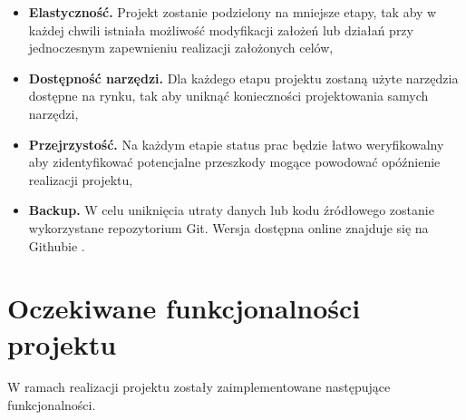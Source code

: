 \documentclass[a4paper,12pt,reqno]{article}
\begin{document}
\begin{itemize}
	\item \textbf{Elastyczność.} Projekt zostanie podzielony na mniejsze etapy, tak aby w każdej chwili istniała możliwość modyfikacji założeń lub działań przy jednoczesnym zapewnieniu realizacji założonych celów,
	\item \textbf{Dostępność narzędzi.} Dla każdego etapu projektu zostaną użyte narzędzia dostępne na rynku, tak aby uniknąć konieczności projektowania samych narzędzi,
	\item \textbf{Przejrzystość.} Na każdym etapie status prac będzie łatwo weryfikowalny aby zidentyfikować potencjalne przeszkody mogące powodować opóźnienie realizacji projektu,
	\item \textbf{Backup.} W celu uniknięcia utraty danych lub kodu źródłowego zostanie wykorzystane repozytorium Git. Wersja dostępna online znajduje się na Githubie \cite{moj_github}.
\end{itemize}

\newpage
\section{Oczekiwane funkcjonalności projektu} \label{section:oczekiwania}

W ramach realizacji projektu zostały zaimplementowane następujące funkcjonalności.
\end{document}
